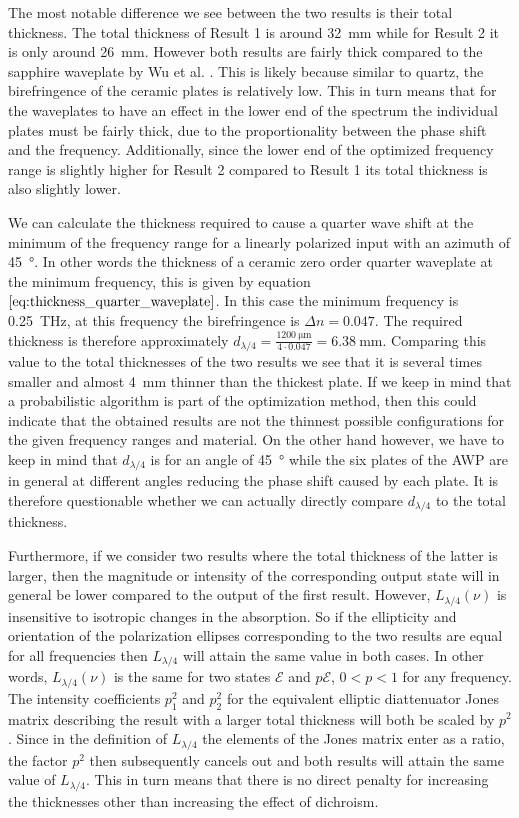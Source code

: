 The most notable difference we see between the two results is their total thickness. The total thickness of Result 1 is around \SI{32}{\milli \meter} while for Result 2 it is only around \SI{26}{\milli \meter}. However both results are fairly thick compared to the sapphire waveplate by Wu et al. \cite{Wu2020}. This is likely because similar to quartz, the birefringence of the ceramic plates is relatively low. This in turn means that for the waveplates to have an effect in the lower end of the spectrum the individual plates must be fairly thick, due to the proportionality between the phase shift and the frequency. Additionally, since the lower end of the optimized frequency range is slightly higher for Result 2 compared to Result 1 its total thickness is also slightly lower.
 
 We can calculate the thickness required to cause a quarter wave shift at the minimum of the frequency range for a linearly polarized input with an azimuth of \SI{45}{\degree}. In other words the thickness of a ceramic zero order quarter waveplate at the minimum frequency, this is given by equation $\ref{eq:thickness_quarter_waveplate}$. In this case the minimum frequency is \SI{0.25}{\tera \hertz}, at this frequency the birefringence is $\Delta n = 0.047$. The required thickness is therefore approximately $d_{\lambda/4}=\frac{\SI{1200}{\micro \meter}}{4\cdot0.047}=\SI{6.38}{\milli \meter}$. Comparing this value to the total thicknesses of the two results we see that it is several times smaller and almost \SI{4}{\milli \meter} thinner than the thickest plate. If we keep in mind that a probabilistic algorithm is part of the optimization method, then this could indicate that the obtained results are not the thinnest possible configurations for the given frequency ranges and material. On the other hand however, we have to keep in mind that $d_{\lambda/4}$ is for an angle of \SI{45}{\degree} while the six plates of the AWP are in general at different angles reducing the phase shift caused by each plate. It is therefore questionable whether we can actually directly compare $d_{\lambda/4}$ to the total thickness.

Furthermore, if we consider two results where the total thickness of the latter is larger, then the magnitude or intensity of the corresponding output state will in general be lower compared to the output of the first result. However, $L_{\lambda/4}(\nu)$ is insensitive to isotropic changes in the absorption. So if the ellipticity and orientation of the polarization ellipses corresponding to the two results are equal for all frequencies then $L_{\lambda/4}$ will attain the same value in both cases. In other words, $L_{\lambda/4}(\nu)$ is the same for two states $\bm{\mathcal{E}}$ and $p\bm{\mathcal{E}}$, $0<p<1$ for any frequency. The intensity coefficients $p_1^2$ and $p_2^2$ for the equivalent elliptic diattenuator Jones matrix describing the result with a larger total thickness will both be scaled by $p^2$. Since in the definition of $L_{\lambda/4}$ the elements of the Jones matrix enter as a ratio, the factor $p^2$ then subsequently cancels out and both results will attain the same value of $L_{\lambda/4}$. This in turn means that there is no direct penalty for increasing the thicknesses other than increasing the effect of dichroism.

